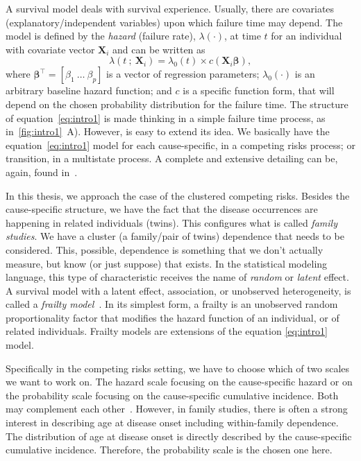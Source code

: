 A survival model deals with survival experience. Usually, there are
covariates (explanatory/independent variables) upon which failure time
may depend. The model is defined by the \textit{hazard} (failure rate),
\(\lambda(\cdot)\), at time \(t\) for an individual with covariate
vector \(\mathbf{X}_{i}\) and can be written as
\begin{equation}
  \lambda(t~;~\mathbf{X}_{i}) =
  \lambda_{0}(t) \times c(\mathbf{X}_{i} \bm{\beta}),
  \label{eq:intro1}
\end{equation}
where \(\bm{\beta}^{\top} = [\beta_{1}~\dots~\beta_{p}]\) is a vector
of regression parameters; \(\lambda_{0}(\cdot)\) is an arbitrary
baseline hazard function; and \(c\) is a specific function form, that
will depend on the chosen probability distribution for the failure time.
The structure of equation~\ref{eq:intro1} is made thinking in a simple
failure time process, as in~\autoref{fig:intro1}~A). However, is easy to
extend its idea. We basically have the equation~\ref{eq:intro1} model
for each cause-specific, in a competing risks process; or transition, in
a multistate process. A complete and extensive detailing can be, again,
found in~.

In this thesis, we approach the case of the clustered competing risks.
Besides the cause-specific structure, we have the fact that the disease
occurrences are happening in related individuals (twins). This
configures what is called \textit{family studies}. We have a cluster (a
family/pair of twins) dependence that needs to be considered. This,
possible, dependence is something that we don't actually measure, but
know (or just suppose) that exists. In the statistical modeling
language, this type of characteristic receives the name of
\textit{random} or \textit{latent} effect. A survival model with a
latent effect, association, or unobserved heterogeneity, is called a
\textit{frailty model}~\cite{frailty78, frailty79}. In its simplest
form, a frailty is an unobserved random proportionality factor that
modifies the hazard function of an individual, or of related
individuals. Frailty models are extensions of the equation
\ref{eq:intro1} model.

Specifically in the competing risks setting, we have to choose which of
two scales we want to work on. The hazard scale focusing on the
cause-specific hazard or on the probability scale focusing on the
cause-specific cumulative incidence. Both may complement each
other~\cite{andersen12}. However, in family studies, there is often a
strong interest in describing age at disease onset including
within-family dependence. The distribution of age at disease onset is
directly described by the cause-specific cumulative incidence.
Therefore, the probability scale is the chosen one here.

